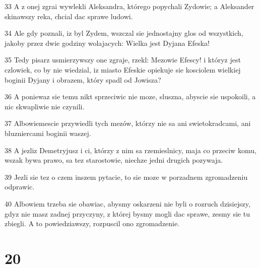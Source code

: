 \par 33 A z onej zgrai wywlekli Aleksandra, którego popychali Zydowie; a Aleksander skinawszy reka, chcial dac sprawe ludowi.
\par 34 Ale gdy poznali, iz byl Zydem, wszczal sie jednostajny glos od wszystkich, jakoby przez dwie godziny wolajacych: Wielka jest Dyjana Efeska!
\par 35 Tedy pisarz usmierzywszy one zgraje, rzekl: Mezowie Efescy! i któryz jest czlowiek, co by nie wiedzial, iz miasto Efeskie opiekuje sie kosciolem wielkiej boginii Dyjany i obrazem, który spadl od Jowisza?
\par 36 A poniewaz sie temu nikt sprzeciwic nie moze, sluszna, abyscie sie uspokoili, a nic skwapliwie nie czynili.
\par 37 Albowiemescie przywiedli tych mezów, którzy nie sa ani swietokradcami, ani bluzniercami boginii waszej.
\par 38 A jezliz Demetryjusz i ci, którzy z nim sa rzemieslnicy, maja co przeciw komu, wszak bywa prawo, sa tez starostowie, niechze jedni drugich pozywaja.
\par 39 Jezli sie tez o czem inszem pytacie, to sie moze w porzadnem zgromadzeniu odprawic.
\par 40 Albowiem trzeba sie obawiac, abysmy oskarzeni nie byli o rozruch dzisiejszy, gdyz nie masz zadnej przyczyny, z której bysmy mogli dac sprawe, zesmy sie tu zbiegli. A to powiedziawszy, rozpuscil ono zgromadzenie.

\chapter{20}

